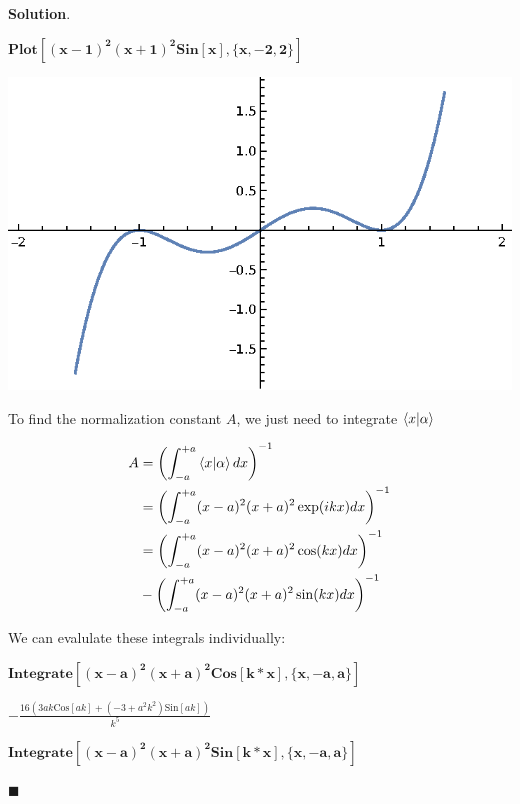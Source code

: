 \documentclass[12pt]{article}
\theoremstyle{definition}
\newenvironment{s}{%
        \begin{trivlist} \item \textbf{Solution}. }{%
            \hspace*{\fill} $\blacksquare$\end{trivlist}}%
\begin{document}
{\begin{s}
\begin{doublespace}
\noindent\(\pmb{\text{Plot}\left[(x-1)^2 (x+1)^2 \text{Sin}[x],\{x,-2,2\}\right]}\)
\end{doublespace}

\includegraphics{test_gr2.eps}

To find the normalization constant $A$, we just need to integrate $\bra{x}\ket{\alpha}$

\begin{align*}
A &= \left(\int_{-a}^{+a}\bra{x}\ket{\alpha}dx\right)^{-1}\\
&= \left(\int_{-a}^{+a}(x-a)^{2}(x+a)^{2}\exp(ikx)dx\right)^{-1}\\
&= \left(\int_{-a}^{+a}(x-a)^{2}(x+a)^{2}\cos(kx)dx\right)^{-1}\\
&- \left(\int_{-a}^{+a}(x-a)^{2}(x+a)^{2}\sin(kx)dx\right)^{-1}
\end{align*}

We can evalulate these integrals individually:

\begin{doublespace}
\noindent\(\pmb{\text{Integrate}\left[(x-a)^2 (x+a)^2 \text{Cos}[k*x],\{x,-a,a\}\right]}\)
\end{doublespace}

\begin{doublespace}
\noindent\(-\frac{16 \left(3 a k \text{Cos}[a k]+\left(-3+a^2 k^2\right) \text{Sin}[a k]\right)}{k^5}\)
\end{doublespace}

\begin{doublespace}
\noindent\(\pmb{\text{Integrate}\left[(x-a)^2 (x+a)^2 \text{Sin}[k*x],\{x,-a,a\}\right]}\)
\end{doublespace}


\end{s}}
\end{document}
